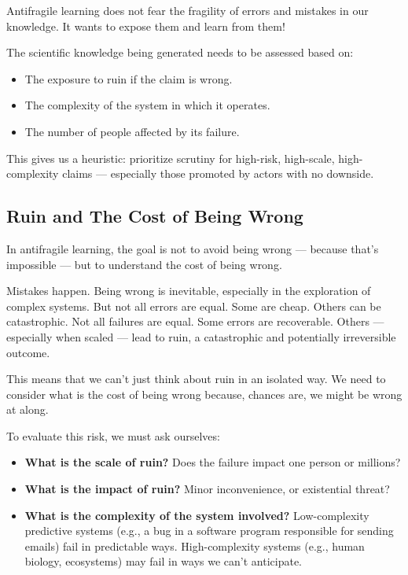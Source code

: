 Antifragile learning does not fear the fragility of errors and mistakes in our knowledge. It wants to expose them and learn from them!

The scientific knowledge being generated needs to be assessed based on:
\begin{itemize}
	\item The exposure to ruin if the claim is wrong.
	\item The complexity of the system in which it operates.
	\item The number of people affected by its failure.
\end{itemize}

This gives us a heuristic: prioritize scrutiny for high-risk, high-scale, high-complexity claims — especially those promoted by actors with no downside.

\subsection{Ruin and The Cost of Being Wrong}

In antifragile learning, the goal is not to avoid being wrong — because that’s impossible — but to understand the cost of being wrong.

Mistakes happen. Being wrong is inevitable, especially in the exploration of complex systems. But not all errors are equal. Some are cheap. Others can be catastrophic. Not all failures are equal.  Some errors are recoverable. Others — especially when scaled — lead to ruin, a catastrophic and potentially irreversible outcome.

This means that we can't just think about ruin in an isolated way. We need to consider what is the cost of being wrong because, chances are, we might be wrong at along.

To evaluate this risk, we must ask ourselves:

\begin{itemize}
	\item \textbf{What is the scale of ruin?} Does the failure impact one person or millions?
	\item \textbf{What is the impact of ruin?} Minor inconvenience, or existential threat?
	\item \textbf{What is the complexity of the system involved?} Low-complexity predictive systems (e.g., a bug in a software program responsible for sending emails) fail in predictable ways. High-complexity systems (e.g., human biology, ecosystems) may fail in ways we can’t anticipate.
\end{itemize}

